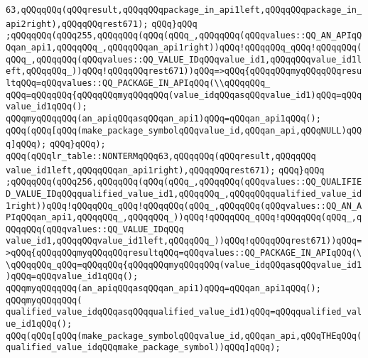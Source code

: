 \verb|63,qQQqqQQq(qQQqresult,qQQqqQQqpackage_in_api1left,qQQqqQQqpackage_in_api2right),qQQqqQQqrest671);|\newline
\verb|qQQq}qQQq|\newline
\verb|;qQQqqQQq(qQQq255,qQQqqQQq(qQQq(qQQq_,qQQqqQQq(qQQqvalues::QQ_AN_APIqQQqan_api1,qQQqqQQq_,qQQqqQQqan_api1right))qQQq!qQQqqQQq_qQQq!qQQqqQQq(qQQq_,qQQqqQQq(qQQqvalues::QQ_VALUE_IDqQQqvalue_id1,qQQqqQQqvalue_id1left,qQQqqQQq_))qQQq!qQQqqQQqrest671))qQQq=>qQQq{qQQqqQQqmyqQQqqQQqresultqQQq=qQQqvalues::QQ_PACKAGE_IN_APIqQQq(\\qQQqqQQq_|\newline
\verb|qQQq=qQQqqQQq{qQQqqQQqmyqQQqqQQq(value_idqQQqasqQQqvalue_id1)qQQq=qQQqvalue_id1qQQq();|\newline
\verb|qQQqmyqQQqqQQq(an_apiqQQqasqQQqan_api1)qQQq=qQQqan_api1qQQq();|\newline
\verb|qQQq(qQQq[qQQq(make_package_symbolqQQqvalue_id,qQQqan_api,qQQqNULL)qQQq]qQQq);|\newline
\verb|qQQq}qQQq);|\newline
\verb|qQQq(qQQqlr_table::NONTERMqQQq63,qQQqqQQq(qQQqresult,qQQqqQQq|\newline
\verb|value_id1left,qQQqqQQqan_api1right),qQQqqQQqrest671);|\newline
\verb|qQQq}qQQq|\newline
\verb|;qQQqqQQq(qQQq256,qQQqqQQq(qQQq(qQQq_,qQQqqQQq(qQQqvalues::QQ_QUALIFIED_VALUE_IDqQQqqualified_value_id1,qQQqqQQq_,qQQqqQQqqualified_value_id1right))qQQq!qQQqqQQq_qQQq!qQQqqQQq(qQQq_,qQQqqQQq(qQQqvalues::QQ_AN_APIqQQqan_api1,qQQqqQQq_,qQQqqQQq_))qQQq!qQQqqQQq_qQQq!qQQqqQQq(qQQq_,qQQqqQQq(qQQqvalues::QQ_VALUE_IDqQQq|\newline
\verb|value_id1,qQQqqQQqvalue_id1left,qQQqqQQq_))qQQq!qQQqqQQqrest671))qQQq=>qQQq{qQQqqQQqmyqQQqqQQqresultqQQq=qQQqvalues::QQ_PACKAGE_IN_APIqQQq(\\qQQqqQQq_qQQq=qQQqqQQq{qQQqqQQqmyqQQqqQQq(value_idqQQqasqQQqvalue_id1)qQQq=qQQqvalue_id1qQQq();|\newline
\verb|qQQqmyqQQqqQQq(an_apiqQQqasqQQqan_api1)qQQq=qQQqan_api1qQQq();|\newline
\verb|qQQqmyqQQqqQQq(|\newline
\verb|qualified_value_idqQQqasqQQqqualified_value_id1)qQQq=qQQqqualified_value_id1qQQq();|\newline
\verb|qQQq(qQQq[qQQq(make_package_symbolqQQqvalue_id,qQQqan_api,qQQqTHEqQQq(qualified_value_idqQQqmake_package_symbol))qQQq]qQQq);|\newline
